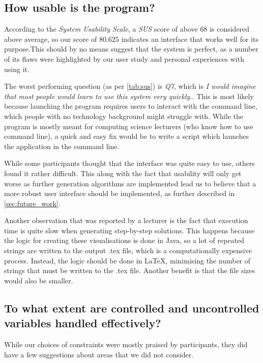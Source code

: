 \documentclass{l4proj}
\begin{document}
\subsection{How usable is the program?}

According to the \emph{System Usability Scale}, a \emph{SUS} score of above $68$ is considered above average, so our score of $80.625$ indicates an interface that works well for its purpose.This should by no means suggest that the system is perfect, as a number of its flaws were highlighted by our user study and personal experiences with using it.

The worst performing question (as per \autoref{tab:sus}) is \emph{Q7}, which is \emph{I would imagine that most people would learn to use this system very quickly.}. This is most likely because launching the program requires users to interact with the command line, which people with no technology background might struggle with. While the program is mostly meant for computing science lecturers (who know how to use command line), a quick and easy fix would be to write a script which launches the application in the command line.

While some participants thought that the interface was quite easy to use, others found it rather difficult. This along with the fact that usability will only get worse as further generation algorithms are implemented lead us to believe that a more robust user interface should be implemented, as further described in \autoref{sec:future_work}.

Another observation that was reported by a lecturer is the fact that execution time is quite slow when generating step-by-step solutions. This happens because the logic for creating these visualisations is done in Java, so a lot of repeated strings are written to the output .tex file, which is a computationally expensive process. Instead, the logic should be done in LaTeX, minimising the number of strings that must be written to the .tex file. Another benefit is that the file sizes would also be smaller.

\subsection{To what extent are controlled and uncontrolled variables handled effectively?}

While our choices of constraints were mostly praised by participants, they did have a few suggestions about areas that we did not consider.
\end{document}
